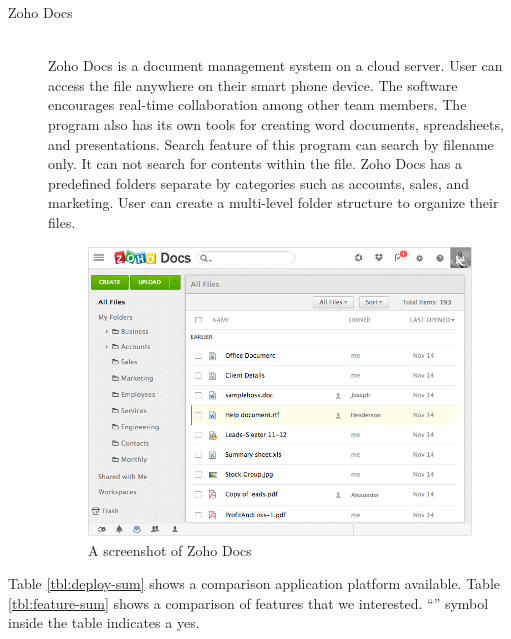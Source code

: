 \begin{description}
\item[Zoho Docs] \hfill \\
Zoho Docs is a document management system on a cloud server.
User can access the file anywhere on their smart phone device.
The software encourages real-time collaboration among other team members.
The program also has its own tools for creating word documents, spreadsheets, and presentations.
Search feature of this program can search by filename only.
It can not search for contents within the file.
Zoho Docs has a predefined folders separate by categories such as accounts, sales, and marketing.
User can create a multi-level folder structure to organize their files.
\begin{figure}[ht]
	\centering
	\includegraphics[scale=0.55]{res/literature/screenshot_zoho}
	\caption{A screenshot of Zoho Docs \cite{zoho-doc}}
\end{figure}
\end{description}

Table \ref{tbl:deploy-sum} shows a comparison application platform available.
Table \ref{tbl:feature-sum} shows a comparison of features that we interested.
\enquote{\checkmark} symbol inside the table indicates a yes.

\clearpage

